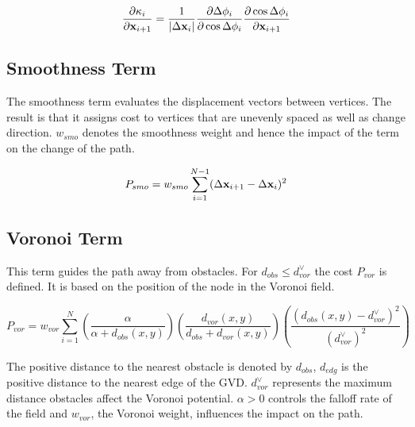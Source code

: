 \begin{equation}
\frac{\partial \kappa_i}{\partial \mathbf{x}_{i+1}} = \frac{1}{|\Delta\mathbf{x}_i|}\frac{\partial\Delta\phi_i}{\partial\cos\Delta\phi_i}\frac{\partial\cos\Delta\phi_i}{\partial\mathbf{x}_{i+1}}
\end{equation}

\subsection{Smoothness Term}
The smoothness term evaluates the displacement vectors between vertices. The result is that it assigns cost to vertices that are unevenly spaced as well as change direction. $w_{smo}$ denotes the smoothness weight and hence the impact of the term on the change of the path.


\begin{equation}
P_{smo} = w_{smo} \displaystyle\sum_{i=1}^{N-1} (\Delta\mathbf{x}_{i+1} - \Delta\mathbf{x}_i)^2
\end{equation}

\subsection{Voronoi Term}
This term guides the path away from obstacles. For $d_{obs} \leq d_{vor}^{\lor}$ the cost $P_{vor}$ is defined. It is based on the position of the node in the Voronoi field.



\begin{equation}
P_{vor} = w_{vor} \displaystyle\sum_{i=1}^{N} \left(\frac{\alpha}{\alpha + d_{obs}(x,y)}\right)\left(\frac{d_{vor}(x,y)}{d_{obs} + d_{vor}(x,y)}\right)\left(\frac{(d_{obs}(x,y) - d_{vor}^{\lor})^2}{(d_{vor}^{\lor})^2}\right)
\end{equation}

The positive distance to the nearest obstacle is denoted by $d_{obs}$, $d_{edg}$ is the positive distance to the nearest edge of the GVD. $d_{vor}^{\lor}$ represents the maximum distance obstacles affect the Voronoi potential. $\alpha > 0$ controls the falloff rate of the field and $w_{vor}$, the Voronoi weight, influences the impact on the path.

